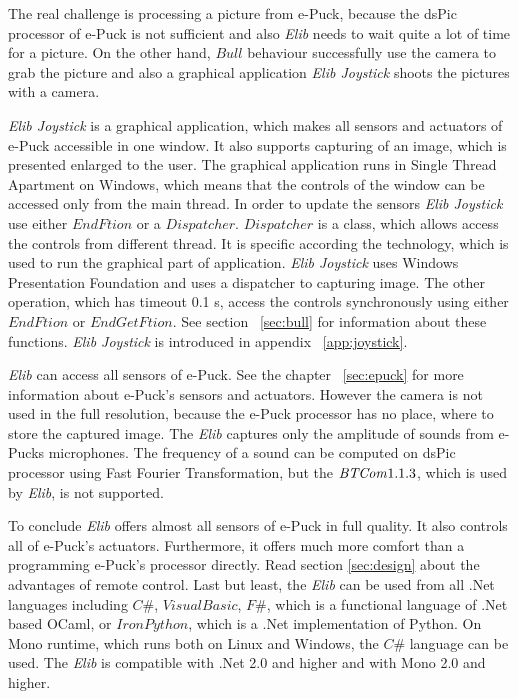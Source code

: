   The real challenge is processing a picture from e-Puck, because the dsPic processor of e-Puck is not sufficient
  and also {\it Elib} needs to wait quite a lot of time for a picture.
  On the other hand, $Bull$ behaviour successfully use the camera to grab the picture
  and also a graphical application {\it Elib Joystick} shoots the pictures with a camera.

  {\it Elib Joystick} is a graphical application, which makes all sensors and actuators of e-Puck accessible in one window.
  It also supports capturing of an image, which is presented enlarged to the user.
  The graphical application runs in Single Thread Apartment on Windows, which means that the controls of the window can 
  be accessed only from the main thread.
  In order to update the sensors {\it Elib Joystick} use either $EndFtion$ or a $Dispatcher$.
  $Dispatcher$ is a class, which allows access the controls from different thread. It is specific according the technology,
  which is used to run the graphical part of application. {\it Elib Joystick} uses Windows Presentation Foundation and
  uses a dispatcher to capturing image. The other operation, which has timeout 0.1 s, access the controls synchronously using
  either $EndFtion$ or $EndGetFtion$. See section ~\ref{sec:bull} for information about these functions.
  {\it Elib Joystick} is introduced in appendix ~\ref{app:joystick}.

  {\it Elib} can access all sensors of e-Puck. See the chapter ~\ref{sec:epuck} for more information about e-Puck's sensors and actuators.
  However the camera is not used in the full resolution,
  because the e-Puck processor has no place, where to store the captured image.
  The {\it Elib} captures only the amplitude of sounds from e-Pucks microphones. 
  The frequency of a sound can be computed on dsPic processor
  using Fast Fourier Transformation, but the ${\it BTCom} 1.1.3$, which is used by {\it Elib}, is not supported.

  To conclude {\it Elib} offers almost all sensors of e-Puck in full quality. It also controls all of e-Puck's actuators.
  Furthermore, it offers much more comfort than a programming e-Puck's processor directly. 
  Read section \ref{sec:design} about the advantages
  of remote control. 
  Last but least, the {\it Elib} can be used from all .Net languages including $C\#$, $Visual Basic$, $F\#$,
  which is a functional language of .Net based OCaml,
  or $Iron Python$, which is a .Net implementation of Python. On Mono runtime, 
  which runs both on Linux and Windows, the $C\#$ language can be used.
  The {\it Elib} is compatible with .Net 2.0\cite{net} and higher and with Mono\cite{mono} 2.0 and higher.

